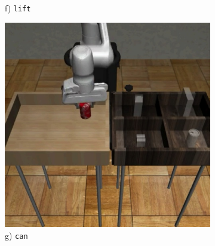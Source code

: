 \begin{figure}[t]
\begin{minipage}{0.24\textwidth}
\begin{subfigure}{\textwidth}
            \caption{\footnotesize f) \texttt{lift}}
        \end{subfigure}
    \end{minipage}\hfill
    \begin{minipage}{0.24\textwidth}
        \begin{subfigure}{\textwidth}
            \centering
            \includegraphics[width=\linewidth]{figures/renders/can.jpeg}
            \caption{\footnotesize g) \texttt{can}}
        \end{subfigure}
    \end{minipage}\hfill
    \begin{minipage}{0.24\textwidth}
        \begin{subfigure}{\textwidth}
            \centering

\end{subfigure}
\end{minipage}
\end{figure}
